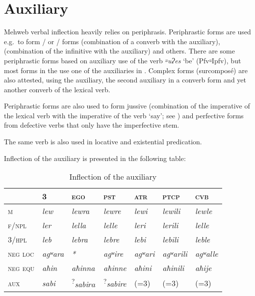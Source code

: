 \documentclass[output=paper]{langsci/langscibook}
\begin{document}


\section{Auxiliary}\label{auxiliary}


Mehweb verbal inflection heavily relies on periphrasis. Periphrastic
forms are used e.g.\ to form / or / forms (combination of a converb with the auxiliary), 
(combination of the infinitive with the auxiliary) and others. There are
some periphrastic forms based on auxiliary use of the verb \emph{꞊uɁes}
`be' (Pfv꞊Ipfv), but most forms in the  use one of
the auxiliaries in . Complex forms (surcomposé) are also attested, using the
auxiliary, the second auxiliary in a converb form and yet
another converb of the lexical verb.

Periphrastic forms are also used to form jussive (combination of the
imperative of the lexical verb with the imperative of the verb `say';
see \citealt{dobrushina2019}) and perfective forms from defective verbs that only
have the imperfective stem.

The same verb is also used in locative and existential predication.

Inflection of the auxiliary is presented in the following table:


\begin{table}[H]
\caption{Inflection of the auxiliary}\label{tab:4:17}

\begin{tabular}{@{}lllllll@{}}
\toprule
& 3 & \textsc{ego} & \textsc{pst} & \textsc{atr} & \textsc{ptcp} & \textsc{cvb}\tabularnewline \midrule
\textsc{m} & \emph{lew} & \emph{lewra} & \emph{lewre} & \emph{lewi} &
\emph{lewili} & \emph{lewle}\tabularnewline
\textsc{f}/\textsc{npl} & \emph{ler} & \emph{lella} & \emph{lelle} & \emph{leri} &
\emph{lerili} & \emph{lelle}\tabularnewline
3/\textsc{hpl} & \emph{leb} & \emph{lebra} & \emph{lebre} & \emph{lebi} &
\emph{lebili} & \emph{leble}\tabularnewline
\textsc{neg} \textsc{loc} & \emph{agʷara} & \emph{*} & \emph{agʷire} & \emph{agʷari} &
\emph{agʷarili} & \emph{agʷalle}\tabularnewline
\textsc{neg} \textsc{equ} & \emph{aħin} & \emph{aħinna} & \emph{aħinne} & \emph{aħini} &
\emph{aħinili} & \emph{aħije}\tabularnewline
\textsc{aux} & \emph{sabi} & \textsuperscript{?}\emph{sabi\(ra\)} &
\textsuperscript{?}\emph{sabire} & (=3) & (=3) & (=3) \tabularnewline
\bottomrule
\end{tabular}
\end{table}
\end{document}
